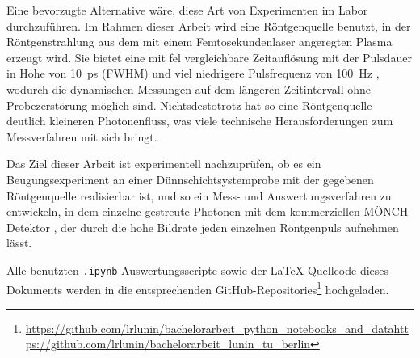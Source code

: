 \noindent
Eine bevorzugte Alternative wäre, diese Art von Experimenten im Labor durchzuführen. Im Rahmen dieser Arbeit wird eine Röntgenquelle benutzt, in der Röntgenstrahlung aus dem mit einem Femtosekundenlaser angeregten Plasma erzeugt wird. Sie bietet eine mit \gls{fel} vergleichbare Zeitauflösung mit der Pulsdauer in Hohe von \SI{10}{\pico\second} (FWHM) und viel niedrigere Pulsfrequenz von \SI{100}{\hertz} \cite{schick_laser-driven_2021}, wodurch die dynamischen Messungen auf dem längeren Zeitintervall ohne Probezerstörung möglich sind. Nichtsdestotrotz hat so eine Röntgenquelle deutlich kleineren Photonenfluss, was viele technische Herausforderungen zum Messverfahren mit sich bringt.

\noindent
Das Ziel dieser Arbeit ist experimentell nachzuprüfen, ob es ein Beugungsexperiment an einer Dünnschichtsystemprobe mit der gegebenen Röntgenquelle realisierbar ist, und so ein Mess- und Auswertungsverfahren zu entwickeln, in dem einzelne gestreute Photonen mit dem kommerziellen MÖNCH-Detektor \cite{ramilli-measurements-2017}, der durch die hohe Bildrate jeden einzelnen Röntgenpuls aufnehmen lässt.

\noindent
Alle benutzten \href{https://github.com/lrlunin/bachelorarbeit_python_notebooks_and_data}{\color{blue}\texttt{.ipynb} Auswertungsscripte} sowie der \href{https://github.com/lrlunin/bachelorarbeit_lunin_tu_berlin}{\color{blue}\LaTeX-Quellcode} dieses Dokuments werden in die entsprechenden GitHub-Repositories\footnote{\url{https://github.com/lrlunin/bachelorarbeit_python_notebooks_and_data}\newline\url{https://github.com/lrlunin/bachelorarbeit_lunin_tu_berlin}} hochgeladen.   


